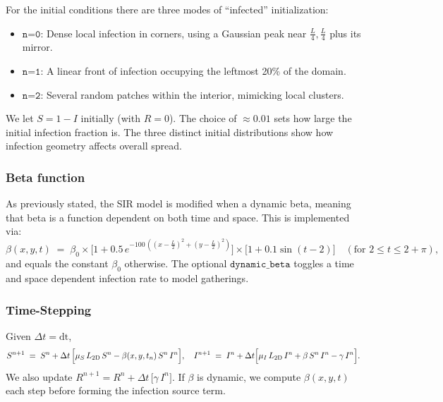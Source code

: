 For the initial conditions there are three modes of “infected” initialization:
\begin{itemize}
  \item \(\texttt{n=0}\): Dense local infection in corners, using a Gaussian peak near \(\tfrac{L}{4},\tfrac{L}{4}\) plus its mirror.
  \item \(\texttt{n=1}\): A linear front of infection occupying the leftmost 20\% of the domain.
  \item \(\texttt{n=2}\): Several random patches within the interior, mimicking local clusters.
\end{itemize}
We let \(S=1 - I\) initially (with \(R=0\)).  The choice of \( \approx 0.01\) sets how large the initial 
infection fraction is. The three distinct initial distributions show how infection geometry affects overall spread. 

\subsubsection{Beta function}
As previously stated, the SIR model is modified when a dynamic beta, meaning that beta is a function dependent on 
both time and space. This is implemented via:
\[
  \beta(x,y,t) 
  \;=\; \beta_0 \times \bigl[1 + 0.5\,e^{-100\,((x-\tfrac{L}{2})^2 + (y-\tfrac{L}{2})^2)}\bigr]
  \times \bigl[1 + 0.1 \sin(t-2)\bigr]\quad (\text{for }2\le t \le 2+\pi),
\]
and equals the constant \(\beta_0\) otherwise. The optional \(\texttt{dynamic\_beta}\) toggles a 
time and space dependent infection rate to model gatherings.

\subsubsection{Time-Stepping}
Given \(\Delta t=\text{dt}\),
\[
  S^{n+1} 
  \;=\;
  S^n + \Delta t\,\Bigl[\mu_S\,L_{\text{2D}}\,S^n - \beta(x,y,t_n)\,S^n\,I^n\Bigr],
  \quad
  I^{n+1}
  \;=\;
  I^n + \Delta t\Bigl[\mu_I\,L_{\text{2D}}\,I^n + \beta\,S^n\,I^n - \gamma\,I^n\Bigr].
\]
We also update 
\(
  R^{n+1} = R^n + \Delta t\,\bigl[\gamma\,I^n\bigr].
\)
If \(\beta\) is dynamic, we compute \(\beta(x,y,t)\) each step before forming the infection source term.